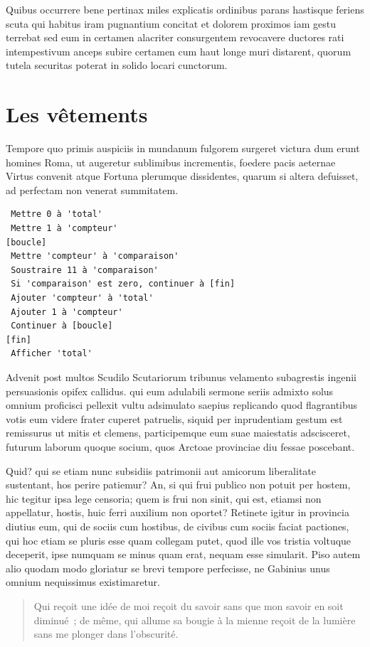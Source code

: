 \documentclass{framatexclass}
\begin{document}
Quibus occurrere bene pertinax miles explicatis ordinibus parans hastisque feriens scuta qui habitus iram pugnantium concitat et dolorem proximos iam gestu terrebat sed eum in certamen alacriter consurgentem revocavere ductores rati intempestivum anceps subire certamen cum haut longe muri distarent, quorum tutela securitas poterat in solido locari cunctorum.

\section{Les vêtements}
Tempore quo primis auspiciis in mundanum fulgorem surgeret victura dum erunt homines Roma, ut augeretur sublimibus incrementis, foedere pacis aeternae Virtus convenit atque Fortuna plerumque dissidentes, quarum si altera defuisset, ad perfectam non venerat summitatem.

\begin{lstlisting}
 Mettre 0 à 'total'
 Mettre 1 à 'compteur'
[boucle]
 Mettre 'compteur' à 'comparaison'
 Soustraire 11 à 'comparaison'
 Si 'comparaison' est zero, continuer à [fin]
 Ajouter 'compteur' à 'total'
 Ajouter 1 à 'compteur'
 Continuer à [boucle]
[fin]
 Afficher 'total'
\end{lstlisting}

Advenit post multos Scudilo Scutariorum tribunus velamento subagrestis ingenii persuasionis opifex callidus. qui eum adulabili sermone seriis admixto solus omnium proficisci pellexit vultu adsimulato saepius replicando quod flagrantibus votis eum videre frater cuperet patruelis, siquid per inprudentiam gestum est remissurus ut mitis et clemens, participemque eum suae maiestatis adscisceret, futurum laborum quoque socium, quos Arctoae provinciae diu fessae poscebant.

Quid? qui se etiam nunc subsidiis patrimonii aut amicorum liberalitate sustentant, hos perire patiemur? An, si qui frui publico non potuit per hostem, hic tegitur ipsa lege censoria; quem is frui non sinit, qui est, etiamsi non appellatur, hostis, huic ferri auxilium non oportet? Retinete igitur in provincia diutius eum, qui de sociis cum hostibus, de civibus cum sociis faciat pactiones, qui hoc etiam se pluris esse quam collegam putet, quod ille vos tristia voltuque deceperit, ipse numquam se minus quam erat, nequam esse simularit. Piso autem alio quodam modo gloriatur se brevi tempore perfecisse, ne Gabinius unus omnium nequissimus existimaretur.

\begin{quotation}

  Qui reçoit une idée de moi reçoit du savoir sans que mon savoir en soit diminué~; de même, qui allume sa bougie à la mienne reçoit de la lumière sans me plonger dans l’obscurité.

\end{quotation}
\end{document}
